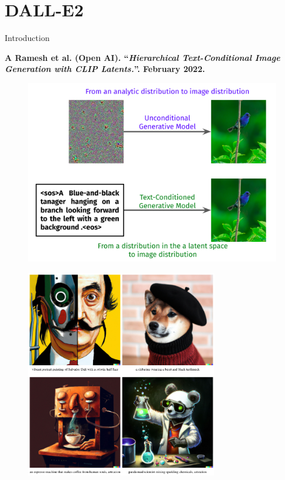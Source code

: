 \documentclass[aspectratio=169, 9pt]{beamer}
\theoremstyle{definition}
\begin{document}
\section{DALL-E2}
\begin{frame}{Introduction}
  \begin{center}
    \bf
    A Ramesh et al. (Open AI). ``\textit{Hierarchical Text-Conditional Image 
    Generation with CLIP Latents.}''. February 2022.
  \end{center}
  \begin{minipage}[t]{0.5\textwidth}
  \begin{figure}[h!]
    \centering
    \includegraphics[width=\textwidth]{./pic/dalle-intro.png}
  \end{figure}
  \end{minipage}\hfill%
  \begin{minipage}[t]{0.5\textwidth}
    \begin{figure}[h]
      \centering
      \includegraphics[width=0.75\textwidth]{./pic/dalle-samples.png}
    \end{figure}
  \end{minipage}
\end{frame}
\end{document}
